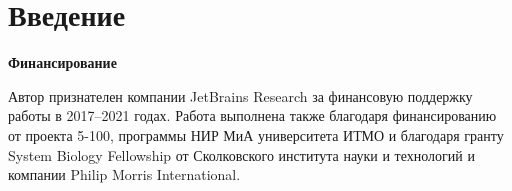 
\chapter*{Введение}                         %


\textbf{Финансирование}

Автор признателен компании JetBrains Research за финансовую поддержку работы в 2017--2021 годах.
Работа выполнена также благодаря финансированию от проекта 5-100, программы НИР МиА университета ИТМО и благодаря гранту System Biology Fellowship от Сколковского института науки и технологий и компании Philip Morris International.